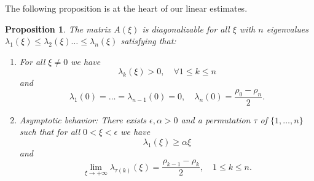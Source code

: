 \documentclass[11pt]{article}
\newtheorem{proposition}{Proposition}[section]
\theoremstyle{definition}
\numberwithin{equation}{section}
\begin{document}
The following proposition is at the heart of our linear estimates.
\begin{proposition}\label{prop linear matrix}
    The matrix $A(\xi)$ is diagonalizable for all $\xi$ with $n$ eigenvalues $\lambda_1(\xi)\leq\lambda_2(\xi)\dots\leq\lambda_n(\xi)$ satisfying that:
    \begin{enumerate}[label=(\roman*), ref=(\roman*)]
        \item\label{item:positive-eigenvalues} For all $\xi\neq0$ we have \begin{equation}
            \lambda_k(\xi)>0,\quad \forall 1\leq k\leq n
        \end{equation} 
        and
        \begin{equation}
            \lambda_1(0)=\dots=\lambda_{n-1}(0)=0,\quad \lambda_n(0)=\frac{\rho_0-\rho_n}{2}.
        \end{equation}

        \item\label{item:asymptotic-eigenvalues}Asymptotic behavior: There exists $\epsilon,\alpha>0$ and a permutation \(\tau\) of \(\{1,\dots,n\}\) such that for all $0<\xi<\epsilon$ we have
        \begin{equation}
            \lambda_1(\xi)\geq\alpha\xi
        \end{equation}
        and
        \begin{equation}
            \lim_{\xi\rightarrow+\infty}\lambda_{\tau(k)}(\xi)=\frac{\rho_{k-1}-\rho_k}{2},\quad 1\leq k\leq n.
        \end{equation}
    \end{enumerate}
\end{proposition}
\end{document}

